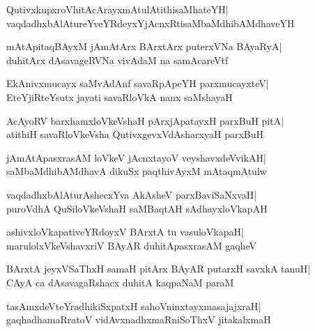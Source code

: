 \documentclass[twoside,12pt,openright]{book}
\newcounter{shloka}[chapter]
\begin{document}
\begin{shloka}%
QutivxkupxroVhitAcArayxmAtulAtithisaMhateYH|\\
vaqdadhxbAlAtureYveYRdeyxYjAcnxRtisaMbaMdhibAMdhaveYH
\end{shloka}

\begin{shloka}%
mAtApitaqBAyxM jAmAtArx BArxtArx puterxVNa BAyaRyA|\\
duhitArx dAsavageRVNa vivAdaM na samAcareVtf
\end{shloka}

\begin{shloka}%
EkAnivxmucayx saMvAdAnf savaRpApeYH parxmucayxteV|\\
EteYjiRteYsutx jayati savaRloVkA nanx saMshayaH
\end{shloka}

\begin{shloka}%
AcAyoRV barxhamxloVkeVshaH pArxjApatayxH parxBuH pitA|\\
atithiH savaRloVkeVsha QutivxgevxVdAsharxyaH parxBuH
\end{shloka}

\begin{shloka}%
jAmAtApasxrasAM loVkeV jAcnxtayoV veyshavxdeVvikAH|\\
saMbaMdhibAMdhavA dikuSx paqthivAyxM mAtaqmAtulw
\end{shloka}

\begin{shloka}%
vaqdadhxbAlAturAshecxYva AkAsheV parxBaviSaNxvaH|\\
puroVdhA QuSiloVkeVshaH saMBaqtAH sAdhayxloVkapAH
\end{shloka}

\begin{shloka}%
ashivxloVkapativeYRdoyxV BArxtA tu vasuloVkapaH|\\
marulolxVkeVshavxriV BAyAR duhitApasxrasAM gaqheV
\end{shloka}

\begin{shloka}%
BArxtA jeyxVSaThxH samaH pitArx BAyAR putarxH savxkA tanuH|\\
CAyA ca dAsavagaRshacx duhitA kaqpaNaM paraM
\end{shloka}

\begin{shloka}%
tasAmxdeVteYradhikiSxpatxH sahoVninxtayxmasajajxraH|\\
gaqhadhamaRratoV vidAvxnadhxmaRniSoThxV jitakalxmaH
\end{shloka}
\end{document}
